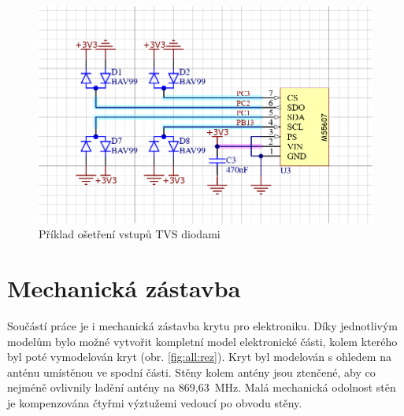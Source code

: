 \documentclass[twoside]{ctuthesis}
\theoremstyle{plain}
\theoremstyle{definition}
\theoremstyle{note}
\begin{document}
		\begin{figure}
			\centering
			\includegraphics[width = .55\textwidth]{Figures/osetreni_vstupu.png}
			\caption{Příklad ošetření vstupů TVS diodami}
			\label{fig:osetreni:vstupu}
		\end{figure}




	\section{Mechanická zástavba}
	Součástí práce je i mechanická zástavba krytu pro elektroniku. 
	Díky jednotlivým modelům bylo možné vytvořit kompletní model elektronické části, kolem kterého byl poté vymodelován kryt (obr. \ref{fig:all:rez}). Kryt byl modelován s ohledem na anténu umístěnou ve spodní části. Stěny kolem antény jsou ztenčené, aby co nejméně ovlivnily ladění antény na 869{,}63~MHz. Malá mechanická odolnost stěn je kompenzována čtyřmi výztužemi vedoucí po obvodu stěny.
\end{document}
